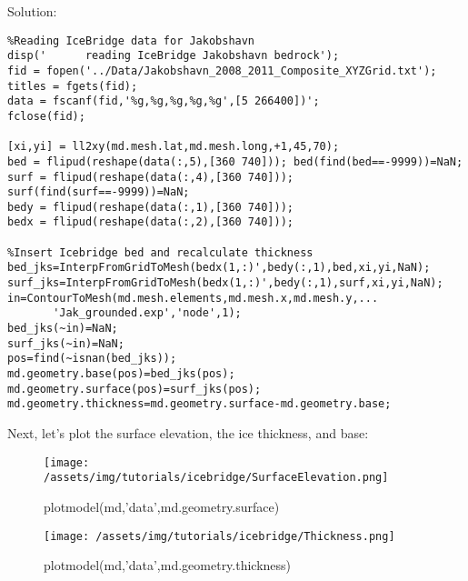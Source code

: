 Solution:
\begin{verbatim}%Reading IceBridge data for Jakobshavn
disp('      reading IceBridge Jakobshavn bedrock');
fid = fopen('../Data/Jakobshavn_2008_2011_Composite_XYZGrid.txt');
titles = fgets(fid); 
data = fscanf(fid,'%g,%g,%g,%g,%g',[5 266400])';
fclose(fid);

[xi,yi] = ll2xy(md.mesh.lat,md.mesh.long,+1,45,70);
bed = flipud(reshape(data(:,5),[360 740])); bed(find(bed==-9999))=NaN;
surf = flipud(reshape(data(:,4),[360 740])); surf(find(surf==-9999))=NaN;
bedy = flipud(reshape(data(:,1),[360 740]));
bedx = flipud(reshape(data(:,2),[360 740]));

%Insert Icebridge bed and recalculate thickness
bed_jks=InterpFromGridToMesh(bedx(1,:)',bedy(:,1),bed,xi,yi,NaN);
surf_jks=InterpFromGridToMesh(bedx(1,:)',bedy(:,1),surf,xi,yi,NaN);
in=ContourToMesh(md.mesh.elements,md.mesh.x,md.mesh.y,...
	   'Jak_grounded.exp','node',1);
bed_jks(~in)=NaN;
surf_jks(~in)=NaN;
pos=find(~isnan(bed_jks));
md.geometry.base(pos)=bed_jks(pos);
md.geometry.surface(pos)=surf_jks(pos);
md.geometry.thickness=md.geometry.surface-md.geometry.base;\end{verbatim}

Next, let's plot the surface elevation, the ice thickness, and base:
\begin{figure}[H]
	\begin{center}
	\texttt{[image: /assets/img/tutorials/icebridge/SurfaceElevation.png]}
	\caption{plotmodel(md,'data',md.geometry.surface)}
	\end{center}
\end{figure}

\begin{figure}[H]
	\begin{center}
	\texttt{[image: /assets/img/tutorials/icebridge/Thickness.png]}
	\caption{plotmodel(md,'data',md.geometry.thickness)}
	\end{center}
\end{figure}

